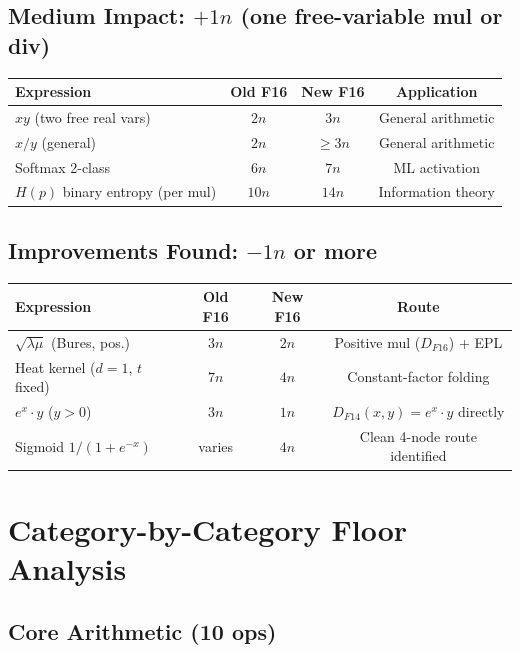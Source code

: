 \documentclass[11pt]{article}
\begin{document}
\subsection{Medium Impact: $+1n$ (one free-variable mul or div)}

\begin{center}
\begin{tabular}{lccc}
\toprule
Expression & Old F16 & New F16 & Application \\
\midrule
$xy$ (two free real vars) & $2n$ & $3n$ & General arithmetic \\
$x/y$ (general) & $2n$ & $\geq 3n$ & General arithmetic \\
Softmax 2-class & $6n$ & $7n$ & ML activation \\
$H(p)$ binary entropy (per mul) & $10n$ & $14n$ & Information theory \\
\bottomrule
\end{tabular}
\end{center}

\subsection{Improvements Found: $-1n$ or more}

\begin{center}
\begin{tabular}{lccc}
\toprule
Expression & Old F16 & New F16 & Route \\
\midrule
$\sqrt{\lambda\mu}$ (Bures, pos.) & $3n$ & $2n$ & Positive mul ($D_{F16}$) + EPL \\
Heat kernel ($d=1$, $t$ fixed) & $7n$ & $4n$ & Constant-factor folding \\
$e^{x}\cdot y$ ($y>0$) & $3n$ & $1n$ & $D_{F14}(x,y) = e^x \cdot y$ directly \\
Sigmoid $1/(1+e^{-x})$ & varies & $4n$ & Clean 4-node route identified \\
\bottomrule
\end{tabular}
\end{center}

\section{Category-by-Category Floor Analysis}

\subsection{Core Arithmetic (10 ops)}
\end{document}
